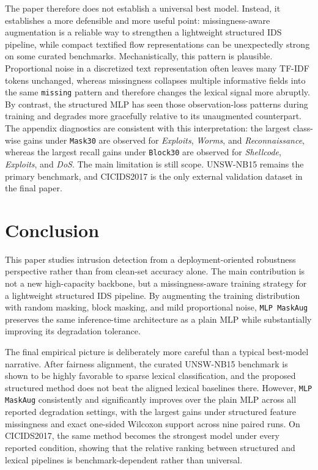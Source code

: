 The paper therefore does not establish a universal best model. Instead, it establishes a more defensible and more useful point: missingness-aware augmentation is a reliable way to strengthen a lightweight structured IDS pipeline, while compact textified flow representations can be unexpectedly strong on some curated benchmarks. Mechanistically, this pattern is plausible. Proportional noise in a discretized text representation often leaves many TF-IDF tokens unchanged, whereas missingness collapses multiple informative fields into the same \texttt{missing} pattern and therefore changes the lexical signal more abruptly. By contrast, the structured MLP has seen those observation-loss patterns during training and degrades more gracefully relative to its unaugmented counterpart. The appendix diagnostics are consistent with this interpretation: the largest class-wise gains under \texttt{Mask30} are observed for \textit{Exploits}, \textit{Worms}, and \textit{Reconnaissance}, whereas the largest recall gains under \texttt{Block30} are observed for \textit{Shellcode}, \textit{Exploits}, and \textit{DoS}. The main limitation is still scope. UNSW-NB15 remains the primary benchmark, and CICIDS2017 is the only external validation dataset in the final paper.

\section{Conclusion}
This paper studies intrusion detection from a deployment-oriented robustness perspective rather than from clean-set accuracy alone. The main contribution is not a new high-capacity backbone, but a missingness-aware training strategy for a lightweight structured IDS pipeline. By augmenting the training distribution with random masking, block masking, and mild proportional noise, \texttt{MLP MaskAug} preserves the same inference-time architecture as a plain MLP while substantially improving its degradation tolerance.

The final empirical picture is deliberately more careful than a typical best-model narrative. After fairness alignment, the curated UNSW-NB15 benchmark is shown to be highly favorable to sparse lexical classification, and the proposed structured method does not beat the aligned lexical baselines there. However, \texttt{MLP MaskAug} consistently and significantly improves over the plain MLP across all reported degradation settings, with the largest gains under structured feature missingness and exact one-sided Wilcoxon support across nine paired runs. On CICIDS2017, the same method becomes the strongest model under every reported condition, showing that the relative ranking between structured and lexical pipelines is benchmark-dependent rather than universal.

